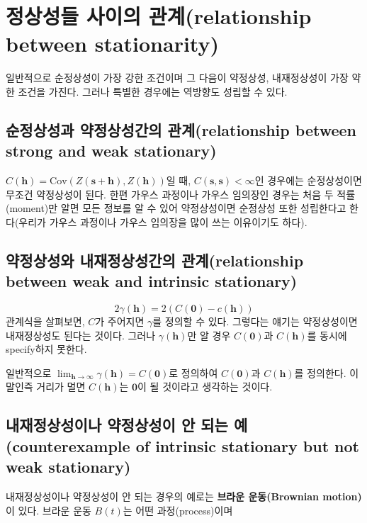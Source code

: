 \documentclass[b5paper,]{book}
\theoremstyle{definition}
\theoremstyle{definition}
\theoremstyle{definition}
\theoremstyle{remark}
\begin{document}
\section{정상성들 사이의 관계(relationship between
stationarity)}\label{--relationship-between-stationarity}

일반적으로 순정상성이 가장 강한 조건이며 그 다음이 약정상성,
내재정상성이 가장 약한 조건을 가진다. 그러나 특별한 경우에는 역방향도
성립할 수 있다.

\subsection{순정상성과 약정상성간의 관계(relationship between strong and
weak
stationary)}\label{--relationship-between-strong-and-weak-stationary}

\(C(\mathbf{h})=\text{Cov}(Z(\mathbf{s}+\mathbf{h}), Z(\mathbf{h}))\)일
때, \(C(\mathbf{s},\mathbf{s}) < \infty\)인 경우에는 순정상성이면 무조건
약정상성이 된다. 한편 가우스 과정이나 가우스 임의장인 경우는 처음 두
적률(moment)만 알면 모든 정보를 알 수 있어 약정상성이면 순정상성 또한
성립한다고 한다(우리가 가우스 과정이나 가우스 임의장을 많이 쓰는
이유이기도 하다).

\subsection{약정상성와 내재정상성간의 관계(relationship between weak and
intrinsic
stationary)}\label{--relationship-between-weak-and-intrinsic-stationary}

\[2\gamma(\mathbf{h})=2(C(\mathbf{0})-c(\mathbf{h}))\] 관계식을
살펴보면, \(C\)가 주어지면 \(\gamma\)를 정의할 수 있다. 그렇다는 얘기는
약정상성이면 내재정상성도 된다는 것이다. 그러나 \(\gamma(\mathbf{h})\)만
알 경우 \(C(\mathbf{0})\)과 \(C(\mathbf{h})\)를 동시에 specify하지
못한다.

일반적으로
\(\lim_{\mathbf{h}\rightarrow \infty}\gamma(\mathbf{h})=C(\mathbf{0})\)로
정의하여 \(C(\mathbf{0})\)과 \(C(\mathbf{h})\)를 정의한다. 이 말인즉
거리가 멀면 \(C(\mathbf{h})\)는 \(\mathbf{0}\)이 될 것이라고 생각하는
것이다.

\subsection{내재정상성이나 약정상성이 안 되는 예(counterexample of
intrinsic stationary but not weak
stationary)}\label{----counterexample-of-intrinsic-stationary-but-not-weak-stationary}

내재정상성이나 약정상성이 안 되는 경우의 예로는 \textbf{브라운
운동(Brownian motion)}이 있다. 브라운 운동 \(B(t)\)는 어떤
과정(process)이며
\end{document}

